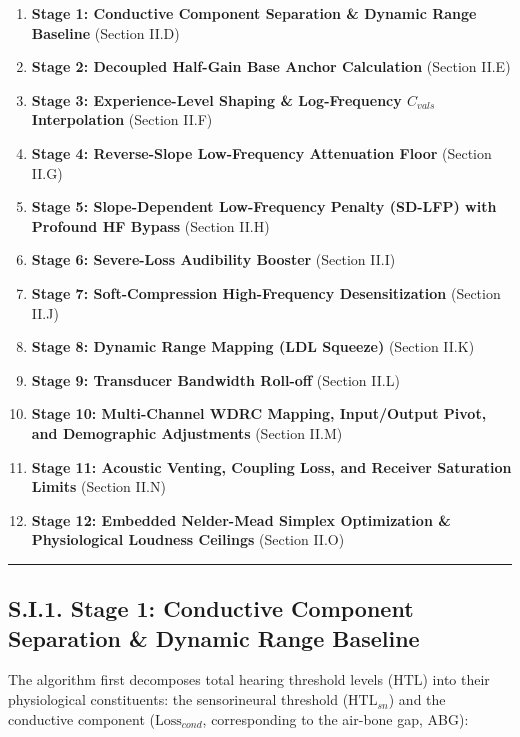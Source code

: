 \documentclass[
  12pt,
]{article}
\providecommand{\tightlist}{%
  \setlength{\itemsep}{0pt}\setlength{\parskip}{0pt}}
\begin{document}
\begin{enumerate}
\def\labelenumi{\arabic{enumi}.}
\tightlist
\item
  \textbf{Stage 1: Conductive Component Separation \& Dynamic Range
  Baseline} (Section II.D)
\item
  \textbf{Stage 2: Decoupled Half-Gain Base Anchor Calculation} (Section
  II.E)
\item
  \textbf{Stage 3: Experience-Level Shaping \& Log-Frequency
  \(C_{vals}\) Interpolation} (Section II.F)
\item
  \textbf{Stage 4: Reverse-Slope Low-Frequency Attenuation Floor}
  (Section II.G)
\item
  \textbf{Stage 5: Slope-Dependent Low-Frequency Penalty (SD-LFP) with
  Profound HF Bypass} (Section II.H)
\item
  \textbf{Stage 6: Severe-Loss Audibility Booster} (Section II.I)
\item
  \textbf{Stage 7: Soft-Compression High-Frequency Desensitization}
  (Section II.J)
\item
  \textbf{Stage 8: Dynamic Range Mapping (LDL Squeeze)} (Section II.K)
\item
  \textbf{Stage 9: Transducer Bandwidth Roll-off} (Section II.L)
\item
  \textbf{Stage 10: Multi-Channel WDRC Mapping, Input/Output Pivot, and
  Demographic Adjustments} (Section II.M)
\item
  \textbf{Stage 11: Acoustic Venting, Coupling Loss, and Receiver
  Saturation Limits} (Section II.N)
\item
  \textbf{Stage 12: Embedded Nelder-Mead Simplex Optimization \&
  Physiological Loudness Ceilings} (Section II.O)
\end{enumerate}

\begin{center}\rule{0.5\linewidth}{0.5pt}\end{center}

\subsection{S.I.1. Stage 1: Conductive Component Separation \& Dynamic
Range
Baseline}\label{s.i.1.-stage-1-conductive-component-separation-dynamic-range-baseline}

The algorithm first decomposes total hearing threshold levels
(\(\text{HTL}\)) into their physiological constituents: the
sensorineural threshold (\(\text{HTL}_{sn}\)) and the conductive
component (\(\text{Loss}_{cond}\), corresponding to the air-bone gap,
ABG):
\end{document}
